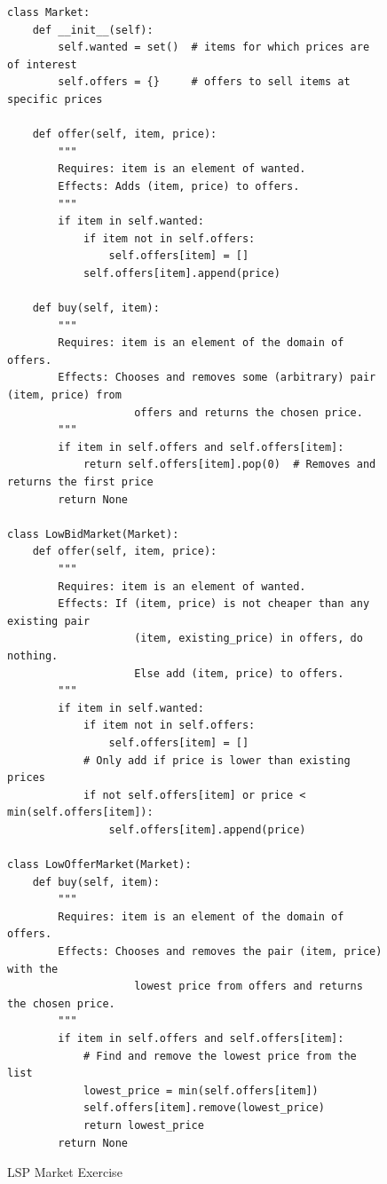 \documentclass[oneside,11pt,dvipsnames]{book}
\begin{document}
\begin{figure}
\begin{lstlisting}
class Market:
    def __init__(self):
        self.wanted = set()  # items for which prices are of interest
        self.offers = {}     # offers to sell items at specific prices

    def offer(self, item, price):
        """
        Requires: item is an element of wanted.
        Effects: Adds (item, price) to offers.
        """
        if item in self.wanted:
            if item not in self.offers:
                self.offers[item] = []
            self.offers[item].append(price)

    def buy(self, item):
        """
        Requires: item is an element of the domain of offers.
        Effects: Chooses and removes some (arbitrary) pair (item, price) from
                    offers and returns the chosen price.
        """
        if item in self.offers and self.offers[item]:
            return self.offers[item].pop(0)  # Removes and returns the first price
        return None

class LowBidMarket(Market):
    def offer(self, item, price):
        """
        Requires: item is an element of wanted.
        Effects: If (item, price) is not cheaper than any existing pair
                    (item, existing_price) in offers, do nothing.
                    Else add (item, price) to offers.
        """
        if item in self.wanted:
            if item not in self.offers:
                self.offers[item] = []
            # Only add if price is lower than existing prices
            if not self.offers[item] or price < min(self.offers[item]):
                self.offers[item].append(price)

class LowOfferMarket(Market):
    def buy(self, item):
        """
        Requires: item is an element of the domain of offers.
        Effects: Chooses and removes the pair (item, price) with the 
                    lowest price from offers and returns the chosen price.
        """
        if item in self.offers and self.offers[item]:
            # Find and remove the lowest price from the list
            lowest_price = min(self.offers[item])
            self.offers[item].remove(lowest_price)
            return lowest_price
        return None                
\end{lstlisting}
\caption{LSP Market Exercise}\label{ex:lsp-market}
\end{figure}
\end{document}
